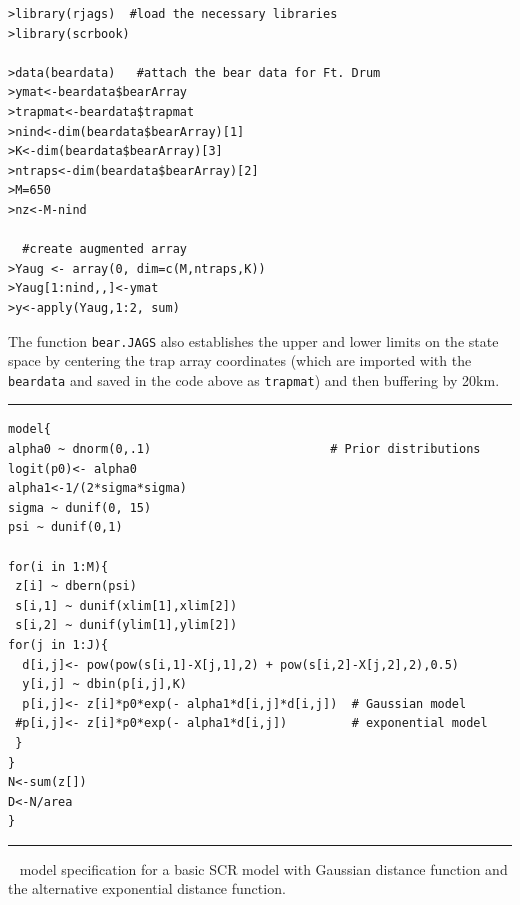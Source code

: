 \begin{verbatim}
>library(rjags)  #load the necessary libraries
>library(scrbook)

>data(beardata)   #attach the bear data for Ft. Drum
>ymat<-beardata$bearArray
>trapmat<-beardata$trapmat
>nind<-dim(beardata$bearArray)[1]
>K<-dim(beardata$bearArray)[3]
>ntraps<-dim(beardata$bearArray)[2]
>M=650
>nz<-M-nind

  #create augmented array
>Yaug <- array(0, dim=c(M,ntraps,K))
>Yaug[1:nind,,]<-ymat
>y<-apply(Yaug,1:2, sum)

\end{verbatim}


The function {\tt bear.JAGS} also establishes the upper 
and lower limits on the state space by centering the trap
array coordinates (which are imported with the {\tt beardata}
and saved in the code above as {\tt trapmat}) and then buffering by 20km.  


\begin{panel}[htp]
\centering
\rule[0.1in]{\textwidth}{.03in}
{\small
\begin{verbatim}
model{
alpha0 ~ dnorm(0,.1)                         # Prior distributions
logit(p0)<- alpha0
alpha1<-1/(2*sigma*sigma)
sigma ~ dunif(0, 15)
psi ~ dunif(0,1)

for(i in 1:M){
 z[i] ~ dbern(psi)
 s[i,1] ~ dunif(xlim[1],xlim[2])
 s[i,2] ~ dunif(ylim[1],ylim[2])
for(j in 1:J){
  d[i,j]<- pow(pow(s[i,1]-X[j,1],2) + pow(s[i,2]-X[j,2],2),0.5)
  y[i,j] ~ dbin(p[i,j],K)
  p[i,j]<- z[i]*p0*exp(- alpha1*d[i,j]*d[i,j])  # Gaussian model
 #p[i,j]<- z[i]*p0*exp(- alpha1*d[i,j])         # exponential model
 }
}
N<-sum(z[])
D<-N/area
}
\end{verbatim}
}

\rule[-0.1in]{\textwidth}{.03in}
\caption{
\jags~ model specification for a basic SCR model with Gaussian
distance 
function and the alternative exponential distance function.}
\label{covariates.panel.basicSCR}
\end{panel}


